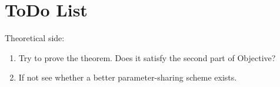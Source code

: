 \documentclass{article}
\newcommand{\mat}[1]{\ensuremath{\mathbf{#1}}}
\newcommand{\set}[1]{\ensuremath{\mathbb{#1}}}
\newcommand{\Trp}[0]{\ensuremath{^{\mathsf{T}}}}
\newcommand{\XX}[0]{\ensuremath{\mat{X}}}
\newcommand{\YY}[0]{\ensuremath{\mat{Y}}}
\newcommand{\yy}[0]{\ensuremath{\mat{y}}}
\newcommand{\zz}[0]{\ensuremath{\mat{z}}}
\renewcommand{\Re}[0]{\ensuremath{\set{R}}}
\theoremstyle{definition}
\begin{document}



\section{ToDo List}
Theoretical side:
\begin{enumerate}
\item Try to prove the theorem. Does it satisfy the second part of Objective? 
\item If not see whether a better parameter-sharing scheme exists.
\end{enumerate}
\end{document}

